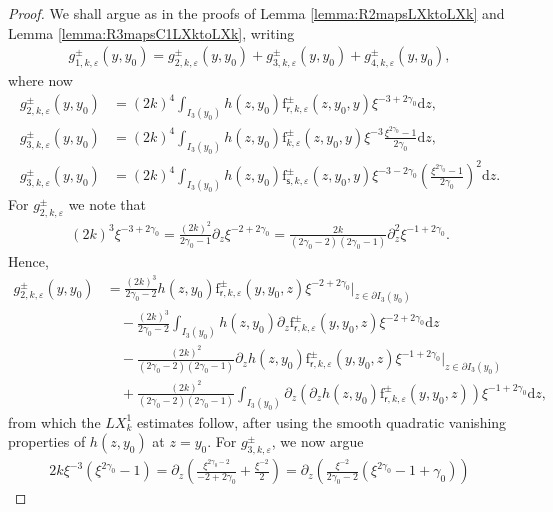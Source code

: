 \documentclass[11pt,reqno]{amsproc}
\theoremstyle{definition}
\numberwithin{equation}{section}
\newcommand{\sr}{{\mathsf{r}}}
\newcommand{\s}{{\mathsf{s}}}
\renewcommand{\d}{\mathrm{d}}
\newcommand{\ep}{\varepsilon}
\begin{document}
\begin{proof}
We shall argue as in the proofs of Lemma \ref{lemma:R2mapsLXktoLXk} and Lemma \ref{lemma:R3mapsC1LXktoLXk}, writing
\begin{align*}
g_{1,k,\ep}^\pm(y,y_0) = g_{2,k,\ep}^\pm(y,y_0) + g_{3,k,\ep}^\pm(y,y_0) + g_{4,k,\ep}^\pm(y,y_0),
\end{align*}
where now
\begin{align*}
g_{2,k,\ep}^\pm(y,y_0) &= (2k)^4\int_{I_3(y_0)}h(z,y_0) \mathrm{f}_{\sr,k,\ep}^\pm(z,y_0,y) \xi^{-3+2\gamma_0} \d z, \\
g_{3,k,\ep}^\pm(y,y_0) &= (2k)^4\int_{I_3(y_0)}h(z,y_0) \mathrm{f}_{k,\ep}^\pm(z,y_0,y) \xi^{-3}\frac{\xi^{2\gamma_0}-1}{2\gamma_0} \d z, \\
g_{3,k,\ep}^\pm(y,y_0) &= (2k)^4\int_{I_3(y_0)}h(z,y_0) \mathrm{f}_{\s,k,\ep}^\pm(z,y_0,y) \xi^{-3-2\gamma_0}\left(\frac{\xi^{2\gamma_0}-1}{2\gamma_0}\right)^2 \d z.
\end{align*}
For $g_{2,k,\ep}^\pm$ we note that
\begin{align*}
(2k)^3 \xi^{-3+2\gamma_0} = \frac{(2k)^2}{2\gamma_0-1}\partial_z \xi^{-2+2\gamma_0} = \frac{2k}{(2\gamma_0-2)(2\gamma_0-1)}\partial_z^2 \xi^{-1+2\gamma_0}.
\end{align*}
Hence,
\begin{align*}
g_{2,k,\ep}^\pm(y,y_0) &= \frac{(2k)^3}{2\gamma_0-2} h(z,y_0) \mathrm{f}_{\sr,k,\ep}^\pm(y,y_0,z) \xi^{-2+2\gamma_0} \Big|_{z\in \partial I_3(y_0)} \\
&\quad - \frac{(2k)^3}{2\gamma_0-2}\int_{I_3(y_0)}h(z,y_0) \partial_z \mathrm{f}_{\sr,k,\ep}^\pm(y,y_0,z) \xi^{-2+2\gamma_0} \d z \\
&\quad - \frac{(2k)^2}{(2\gamma_0-2)(2\gamma_0-1)}\partial_z h(z,y_0) \mathrm{f}_{\sr,k,\ep}^\pm(y,y_0,z) \xi^{-1+2\gamma_0} \Big|_{z\in \partial I_3(y_0)} \\
&\quad + \frac{(2k)^2}{(2\gamma_0-2)(2\gamma_0-1)}\int_{I_3(y_0)} \partial_z \left( \partial_z h(z,y_0) \mathrm{f}_{\sr,k,\ep}^\pm(y,y_0,z) \right) \xi^{-1+2\gamma_0} \d z,
\end{align*}
from which the $LX_k^1$ estimates follow, after using the smooth quadratic vanishing properties of $h(z,y_0)$ at $z=y_0$. For $g_{3,k,\ep}^\pm$, we now argue 
\begin{align*}
2k\xi^{-3}\left( \xi^{2\gamma_0}-1\right) = \partial_z \left( \frac{\xi^{2\gamma_0-2}}{-2+2\gamma_0} +\frac{\xi^{-2}}{2} \right) = \partial_z \left( \frac{\xi^{-2}}{2\gamma_0-2} \left(  \xi^{2\gamma_0} -1 + \gamma_0 \right) \right)
\end{align*}

\end{proof}
\end{document}
